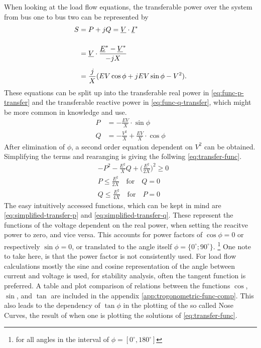 When looking at the load flow equations, the transferable power over the system from bus one to bus two can be represented by
\begin{align}
    S&=P + jQ = \underline{V} \cdot \underline{I}^* \notag \\[12pt]
    &=\underline{V} \cdot \frac{\underline{E}^* - \underline{V}^*}{-jX} \notag \\[6pt]
    &=\frac{j}{X} (EV \cos \phi + jEV \sin \phi -V^2). \notag
\end{align}
These equations can be split up into the transferable real power in \autoref{eq:func-p-transfer} and the transferable reactive power in \autoref{eq:func-q-transfer}, which might be more common in knowledge and use.
\begin{align}
    P&=-\frac{EV}{X} \cdot \sin \phi \label{eq:func-p-transfer} \\[6pt]
    Q&=-\frac{V^2}{X} + \frac{EV}{X} \cdot \cos \phi \label{eq:func-q-transfer}
\end{align}
After elimination of $\phi$, a second order equation dependent on $V^2$ can be obtained.
Simplifying the terms and rearanging is giving the follwing \autoref{eq:transfer-func}.
\begin{align}
    &-P^2 - \frac{E^2}{X}Q + \bigg(\frac{E^2}{2X}\bigg)^2 \geq 0 \label{eq:transfer-func} \\[12pt]
    &P \leq \frac{E^2}{2X} \quad\text{for}\quad Q=0 \label{eq:simplified-transfer-p} \\[6pt]
    &Q \leq \frac{E^2}{4X} \quad\text{for}\quad P=0 \label{eq:simplified-transfer-q}
\end{align}
The easy intuitively accessed functions, which can be kept in mind are \autoref{eq:simplified-transfer-p} and \autoref{eq:simplified-transfer-q}.
These represent the functions of the voltage dependent on the real power, when setting the reacitve power to zero, and vice versa. 
This accounts for power factors of $\cos \phi = 0$ or respectively $\sin \phi = 0$, or translated to the angle itself $\phi = \{0^\circ; 90^\circ\}$.
\footnote{for all angles in the interval of $\phi = [0^\circ, 180^\circ]$}
One note to take here, is that the power factor is not consistently used.
For load flow calculations mostly the sine and cosine representation of the angle between current and voltage is used, for stability analysis, often the tangent function is preferred.
A table and plot comparison of relations between the functions $\cos$, $\sin$, and $\tan$ are included in the appendix \autoref{app:trogonometric-func-comp}. 
This also leads to the dependency of $\tan \phi$ in the plotting of the so called Nose Curves, the result of when one is plotting the solutions of \autoref{eq:transfer-func}.

